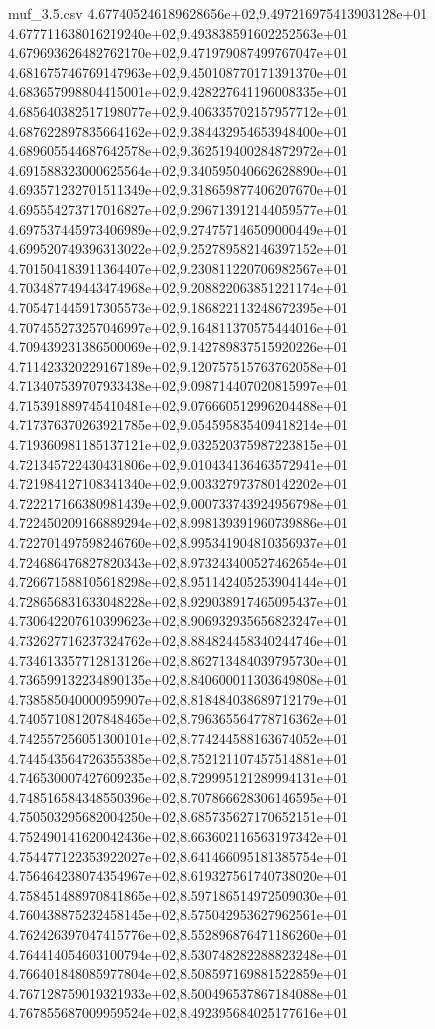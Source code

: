 \begin{filecontents*}{muf_3.5.csv}
4.677405246189628656e+02,9.497216975413903128e+01
4.677711638016219240e+02,9.493838591602252563e+01
4.679693626482762170e+02,9.471979087499767047e+01
4.681675746769147963e+02,9.450108770171391370e+01
4.683657998804415001e+02,9.428227641196008335e+01
4.685640382517198077e+02,9.406335702157957712e+01
4.687622897835664162e+02,9.384432954653948400e+01
4.689605544687642578e+02,9.362519400284872972e+01
4.691588323000625564e+02,9.340595040662628890e+01
4.693571232701511349e+02,9.318659877406207670e+01
4.695554273717016827e+02,9.296713912144059577e+01
4.697537445973406989e+02,9.274757146509000449e+01
4.699520749396313022e+02,9.252789582146397152e+01
4.701504183911364407e+02,9.230811220706982567e+01
4.703487749443474968e+02,9.208822063851221174e+01
4.705471445917305573e+02,9.186822113248672395e+01
4.707455273257046997e+02,9.164811370575444016e+01
4.709439231386500069e+02,9.142789837515920226e+01
4.711423320229167189e+02,9.120757515763762058e+01
4.713407539707933438e+02,9.098714407020815997e+01
4.715391889745410481e+02,9.076660512996204488e+01
4.717376370263921785e+02,9.054595835409418214e+01
4.719360981185137121e+02,9.032520375987223815e+01
4.721345722430431806e+02,9.010434136463572941e+01
4.721984127108341340e+02,9.003327973780142202e+01
4.722217166380981439e+02,9.000733743924956798e+01
4.722450209166889294e+02,8.998139391960739886e+01
4.722701497598246760e+02,8.995341904810356937e+01
4.724686476827820343e+02,8.973243400527462654e+01
4.726671588105618298e+02,8.951142405253904144e+01
4.728656831633048228e+02,8.929038917465095437e+01
4.730642207610399623e+02,8.906932935656823247e+01
4.732627716237324762e+02,8.884824458340244746e+01
4.734613357712813126e+02,8.862713484039795730e+01
4.736599132234890135e+02,8.840600011303649808e+01
4.738585040000959907e+02,8.818484038689712179e+01
4.740571081207848465e+02,8.796365564778716362e+01
4.742557256051300101e+02,8.774244588163674052e+01
4.744543564726355385e+02,8.752121107457514881e+01
4.746530007427609235e+02,8.729995121289994131e+01
4.748516584348550396e+02,8.707866628306146595e+01
4.750503295682004250e+02,8.685735627170652151e+01
4.752490141620042436e+02,8.663602116563197342e+01
4.754477122353922027e+02,8.641466095181385754e+01
4.756464238074354967e+02,8.619327561740738020e+01
4.758451488970841865e+02,8.597186514972509030e+01
4.760438875232458145e+02,8.575042953627962561e+01
4.762426397047415776e+02,8.552896876471186260e+01
4.764414054603100794e+02,8.530748282288823248e+01
4.766401848085977804e+02,8.508597169881522859e+01
4.767128759019321933e+02,8.500496537867184088e+01
4.767855687009959524e+02,8.492395684025177616e+01

\end{filecontents*}
